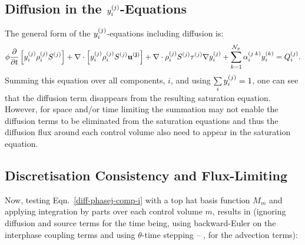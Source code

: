 \subsection{Diffusion in the $\mfr[y]{i}{j}$-Equations} \label{Chapter:CompositionalModel:Section:DiffusionYij}
The general form of the $\mfr[y]{i}{j}$-equations including diffusion is: 
\begin{equation}
\phi  \frc{\partial}{\partial t}\left[\mfr[y]{i}{j}\mfr[\rho]{i}{j}\mfr[S]{}{j} \right] + \nabla\cdot\left[\mfr[y]{i}{j}\mfr[\rho]{i}{j}\mfr[S]{}{j}\mathbf{\mfr[u]{}{j}}  \right] + \nabla\cdot\mfr[\rho]{i}{j}\mfr[S]{}{j}\mfr[\tau]{}{j}\nabla\mfr[y]{i}{j} + \summation_{k=1}^{\mathcal{N}_{p}} \mfr[\alpha]{i}{j\;k}\mfr[y]{i}{k} = \mfr[Q]{i}{j}. \label{diff-phasej-comp-i}
\end{equation}
Summing this equation over all components, $i$, and using $\summation_{i} \mfr[y]{i}{j}=1$, one can see that the diffusion term disappears from the resulting saturation equation. However, for space and/or time limiting the summation may not enable the diffusion terms to be eliminated from the saturation equations and thus the diffusion flux around each control volume also need to appear in the saturation equation.

\subsection{Discretisation Consistency and Flux-Limiting} \label{Chapter:CompositionalModel:Section:FluxLimiting}
Now, testing Eqn.~\ref{diff-phasej-comp-i} with a top hat basis function $M_m$ and applying integration by parts over each control volume $m$, results in (ignoring diffusion and source terms for the time being, using backward-Euler on the interphase coupling terms and using $\theta$-time stepping -- \citet{gomes_book_2012}, for the advection terms): 

